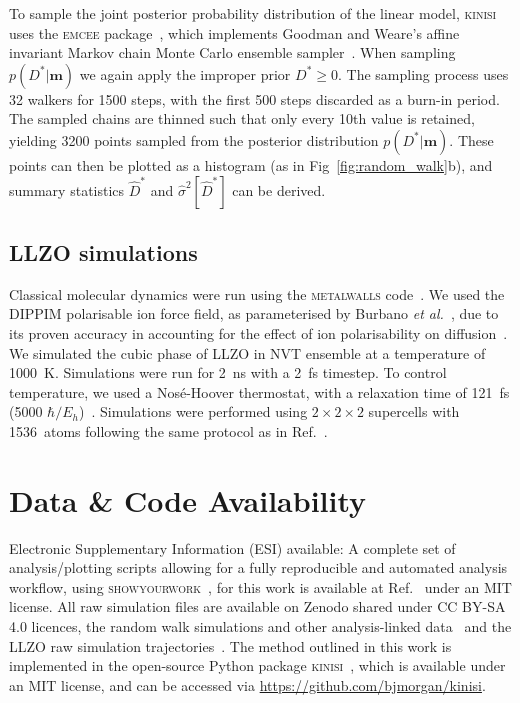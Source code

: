 \documentclass[reprint,superscriptaddress,nobibnotes,amsmath,amssymb,aps,prx,hidelinks,linenumbers]{revtex4-2}
\newcommand{\model}{\bm{m}}
\newcommand{\prob}[1]{\ensuremath{p(#1)}}
\newcommand{\Dest}{\ensuremath{\widehat{D}^*}}
\newcommand{\D}{\ensuremath{D^*}}
\newcommand{\varest}[1]{\ensuremath{\widehat{\sigma}^2[#1]}}
\begin{document}
To sample the joint posterior probability distribution of the linear model, \textsc{kinisi} uses the \textsc{emcee} package~\cite{foremanmackey_emcee_2019}, which implements Goodman and Weare's affine invariant Markov chain Monte Carlo ensemble sampler~\cite{goodman_ensemble_2010}. 
When sampling $\prob{\D|\model}$ we again apply the improper prior $\D \ge 0$.
The sampling process uses \num{32} walkers for \num{1500} steps, with the first \num{500} steps discarded as a burn-in period.
The sampled chains are thinned such that only every 10th value is retained, yielding \num{3200} points sampled from the posterior distribution $\prob{\D|\model}$.
These points can then be plotted as a histogram (as in Fig~\ref{fig:random_walk}b), and summary statistics $\Dest$ and $\varest{\Dest}$ can be derived.

\subsection{LLZO simulations}
Classical molecular dynamics were run using the \textsc{metalwalls} code~\cite{marin_metalwalls_2020}. 
We used the DIPPIM polarisable ion force field, as parameterised by Burbano \emph{et al.}~\cite{burbano_sparse_2016}, due to its proven accuracy in accounting for the effect of ion polarisability on diffusion~\cite{wilson_polarization_1993,burbano_sparse_2016}. 
We simulated the cubic phase of LLZO in NVT ensemble at a temperature of \SI{1000}{\kelvin}.
Simulations were run for \SI{2}{\nano\second} with a \SI{2}{\femto\second} timestep. 
To control temperature, we used a Nos\'{e}-Hoover thermostat, with a relaxation time of \SI{121}{\femto\second} (5000 $\hbar / E_{h}$)~\cite{nose_unified_1984,hoover_canonical_1985,martyna_nose_1992}. 
Simulations were performed using $2 \times 2 \times 2$ supercells with \SI{1536}{atoms} following the same protocol as in Ref.~.

\section*{Data \& Code Availability}

Electronic Supplementary Information (ESI) available: A complete set of analysis/plotting scripts allowing for a fully reproducible and automated analysis workflow, using \textsc{showyourwork}~\cite{luger_showyourwork_2021}, for this work is available at Ref.~\cite{mccluskey_github_2022} under an MIT license.
All raw simulation files are available on Zenodo shared under CC BY-SA 4.0 licences, the random walk simulations and other analysis-linked data~\cite{mccluskey_zenodo_2022} and the LLZO raw simulation trajectories~\cite{coles_llzo_zenodo_2022}.
The method outlined in this work is implemented in the open-source Python package \textsc{kinisi}~\cite{mccluskey_kinisi_2022}, which is available under an MIT license, and can be accessed via \url{https://github.com/bjmorgan/kinisi}.
\end{document}
